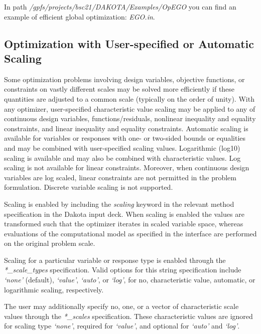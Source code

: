 \documentclass[12pt,a4paper,article]{memoir}
\begin{document}
\begin{description}
In path \textit{/gpfs/projects/bsc21/DAKOTA/Examples/OpEGO} you can find an example of efficient global optimization: \textit{EGO.in}.

\end{description}

\subsection{Optimization with User-specified or Automatic Scaling}

Some optimization problems involving design variables, objective functions, or constraints on vastly different scales may be solved more efficiently if these quantities are adjusted to a common scale (typically on the order of unity). With any optimizer, user-specified characteristic value scaling may be applied to any of continuous design variables, functions/residuals, nonlinear inequality and equality constraints, and linear inequality and equality constraints. Automatic scaling is available for variables or
responses with one- or two-sided bounds or equalities and may be combined with user-specified scaling values. Logarithmic (log10) scaling is available and may also be combined with characteristic values. Log scaling is not available for linear constraints. Moreover, when continuous design variables are log scaled, linear constraints are not permitted in the problem formulation. Discrete variable scaling is not supported.

Scaling is enabled by including the \textit{scaling} keyword in the relevant method specification in the Dakota input deck. When scaling is enabled the values are transformed such that the optimizer iterates in scaled variable space, whereas evaluations of the computational model as specified in the interface are performed on the original problem scale.

Scaling for a particular variable or response type is enabled through the \textit{*\_scale\_types} specification. Valid options
for this string specification include \textit{`none'} (default), \textit{`value'}, \textit{`auto'}, or \textit{`log'}, for no, characteristic value, automatic, or logarithmic scaling, respectively.

The user may additionally specify no, one, or a vector of characteristic scale values through the \textit{*\_scales} specification. These characteristic values are ignored for scaling type \textit{`none'}, required for \textit{`value'}, and optional for \textit{`auto'} and \textit{`log'}.
\end{document}
